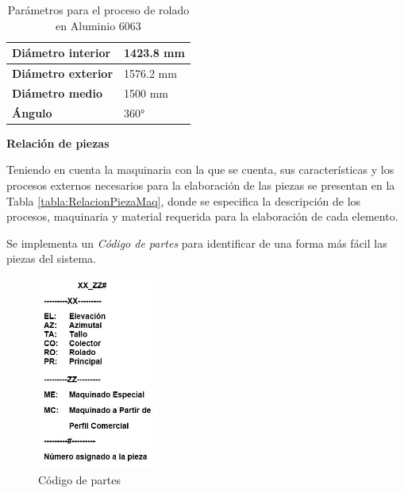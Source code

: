 \begin{table}[H]
  \centering
  \caption{Parámetros para el proceso de rolado en Aluminio 6063 \cite{Rol}}
    \begin{tabular}{|l|l|}
    \hline
    \textbf{Diámetro interior} & 1423.8 mm \\
    \hline
    \textbf{Diámetro exterior} & 1576.2 mm \\
    \hline
    \textbf{Diámetro medio} & 1500 mm \\
    \hline
    \textbf{Ángulo} & 360° \\
    \hline
    \end{tabular}%
  \label{tab:Rol}%
\end{table}%

\textbf{Relación de piezas}

Teniendo en cuenta la maquinaria con la que se cuenta,  sus características y los procesos externos necesarios para la elaboración de las piezas se presentan en la Tabla \ref{tabla:RelacionPiezaMaq}, donde se especifica la descripción de los procesos, maquinaria y material requerida para la elaboración de cada elemento.

Se implementa un \textit{Código de partes} para identificar de una forma más fácil las piezas del sistema.

\begin{figure}[H]
	\centering
	\includegraphics[width=4cm]{imagenes/nomenclatura}
	\caption{Código de partes}
	\label{fig:nomenclatura}
\end{figure}

